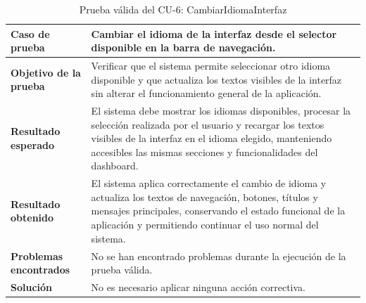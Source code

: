 \begin{table}[H]
\centering
\small
\begin{tabularx}{\textwidth}{|p{}|X|}
\hline
\textbf{Caso de prueba} & Cambiar el idioma de la interfaz desde el selector disponible en la barra de navegación. \\ \hline
\textbf{Objetivo de la prueba} & Verificar que el sistema permite seleccionar otro idioma disponible y que actualiza los textos visibles de la interfaz sin alterar el funcionamiento general de la aplicación. \\ \hline
\textbf{Resultado esperado} & El sistema debe mostrar los idiomas disponibles, procesar la selección realizada por el usuario y recargar los textos visibles de la interfaz en el idioma elegido, manteniendo accesibles las mismas secciones y funcionalidades del dashboard. \\ \hline
\textbf{Resultado obtenido} & El sistema aplica correctamente el cambio de idioma y actualiza los textos de navegación, botones, títulos y mensajes principales, conservando el estado funcional de la aplicación y permitiendo continuar el uso normal del sistema. \\ \hline
\textbf{Problemas encontrados} & No se han encontrado problemas durante la ejecución de la prueba válida. \\ \hline
\textbf{Solución} & No es necesario aplicar ninguna acción correctiva. \\ \hline
\end{tabularx}
\caption{Prueba válida del CU-6: CambiarIdiomaInterfaz}
\label{tab:prueba_valida_cu6}
\normalsize
\end{table}


